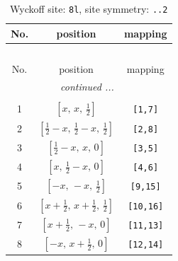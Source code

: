 \documentclass[fleqn,8pt]{jsarticle}
\begin{document}
\begin{longtable}{ccc}
\caption{Wyckoff site: {\tt 8l}, site symmetry: {\tt ..2}}
 \\
 \hline \hline
No. & position & mapping \\ \hline \endfirsthead

\multicolumn{2}{l}{\tablename\ \thetable{}} \\
 \hline \hline
No. & position & mapping \\ \hline \endhead

 \hline \hline
\multicolumn{2}{r}{\footnotesize\it continued ...} \\ \endfoot

 \hline \hline
\multicolumn{2}{r}{} \\ \endlastfoot

1 & $\left[ x,\, x,\, \frac{1}{2} \right]$ & {\tt [1,7]} \\ \hline
2 & $\left[ \frac{1}{2} - x,\, \frac{1}{2} - x,\, \frac{1}{2} \right]$ & {\tt [2,8]} \\ \hline
3 & $\left[ \frac{1}{2} - x,\, x,\, 0 \right]$ & {\tt [3,5]} \\ \hline
4 & $\left[ x,\, \frac{1}{2} - x,\, 0 \right]$ & {\tt [4,6]} \\ \hline
5 & $\left[ - x,\, - x,\, \frac{1}{2} \right]$ & {\tt [9,15]} \\ \hline
6 & $\left[ x + \frac{1}{2},\, x + \frac{1}{2},\, \frac{1}{2} \right]$ & {\tt [10,16]} \\ \hline
7 & $\left[ x + \frac{1}{2},\, - x,\, 0 \right]$ & {\tt [11,13]} \\ \hline
8 & $\left[ - x,\, x + \frac{1}{2},\, 0 \right]$ & {\tt [12,14]} \\
\end{longtable}
\renewcommand{\arraystretch}{1.2}
\end{document}
